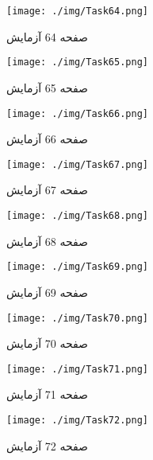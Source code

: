 { 
\begin{figure}[htpb]
\centering
\texttt{[image: ./img/Task64.png]}
\caption{ صفحه 64 آزمایش }
\label{fig:Task64}
\end{figure}
 
 
\begin{figure}[htpb]
\centering
\texttt{[image: ./img/Task65.png]}
\caption{ صفحه 65 آزمایش }
\label{fig:Task65}
\end{figure}
 
 
\begin{figure}[htpb]
\centering
\texttt{[image: ./img/Task66.png]}
\caption{ صفحه 66 آزمایش }
\label{fig:Task66}
\end{figure}
 
 
\begin{figure}[htpb]
\centering
\texttt{[image: ./img/Task67.png]}
\caption{ صفحه 67 آزمایش }
\label{fig:Task67}
\end{figure}
 
 
\begin{figure}[htpb]
\centering
\texttt{[image: ./img/Task68.png]}
\caption{ صفحه 68 آزمایش }
\label{fig:Task68}
\end{figure}
 
 
\begin{figure}[htpb]
\centering
\texttt{[image: ./img/Task69.png]}
\caption{ صفحه 69 آزمایش }
\label{fig:Task69}
\end{figure}
 
 
\begin{figure}[htpb]
\centering
\texttt{[image: ./img/Task70.png]}
\caption{ صفحه 70 آزمایش }
\label{fig:Task70}
\end{figure}
 
 
\begin{figure}[htpb]
\centering
\texttt{[image: ./img/Task71.png]}
\caption{ صفحه 71 آزمایش }
\label{fig:Task71}
\end{figure}
 
 
\begin{figure}[htpb]
\centering
\texttt{[image: ./img/Task72.png]}
\caption{ صفحه 72 آزمایش }
\label{fig:Task72}
\end{figure}
 
}
